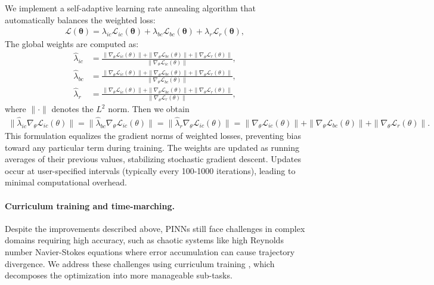 We implement a self-adaptive learning rate annealing algorithm \cite{wang2021understanding} that automatically balances the weighted loss:
\begin{align}
    \mathcal{L}(\mathbf{\theta}) =  \lambda_{ic} \mathcal{L}_{ic}(\mathbf{\theta}) + \lambda_{bc} \mathcal{L}_{bc}(\mathbf{\theta}) +  \lambda_r \mathcal{L}_r(\mathbf{\theta}), 
\end{align}
The global weights are computed as:
  \begin{align}
  \label{eq: lambda_ic_update}
     \hat{\lambda}_{ic} &=  \frac{  \|\nabla_{\theta}  \mathcal{L}_{ic}(\theta)\| +  \|\nabla_{\theta}  \mathcal{L}_{bc}(\theta)\| +  \|\nabla_{\theta}  \mathcal{L}_{r}(\theta)\|   } {\|\nabla_{\theta}  \mathcal{L}_{ic}(\theta)\|}, \\
     \label{eq: lambda_bc_update}
      \hat{\lambda}_{bc} &= \frac{  \|\nabla_{\theta}  \mathcal{L}_{ic}(\theta)\| +  \|\nabla_{\theta}  \mathcal{L}_{bc}(\theta)\| +  \|\nabla_{\theta}  \mathcal{L}_{r}(\theta)\|   } {\|\nabla_{\theta}  \mathcal{L}_{bc}(\theta)\|},  \\
      \label{eq: lambda_r_update}
       \hat{\lambda}_{r} &=  \frac{  \|\nabla_{\theta}  \mathcal{L}_{ic}(\theta)\| +  \|\nabla_{\theta}  \mathcal{L}_{bc}(\theta)\| +  \|\nabla_{\theta}  \mathcal{L}_{r}(\theta)\|   } {\|\nabla_{\theta}  \mathcal{L}_{r}(\theta)\|}, 
  \end{align}
where $\|\cdot\|$ denotes the $L^2$ norm.
Then we obtain
\begin{align}
  \| \hat{\lambda}_{ic} \nabla_\theta \mathcal{L}_{ic} (\theta) \| =   \| \hat{\lambda}_{bc} \nabla_\theta \mathcal{L}_{ic} (\theta) \| = \| \hat{\lambda}_{r} \nabla_\theta \mathcal{L}_{ic} (\theta) \| = \| \nabla_\theta \mathcal{L}_{ic} (\theta) \| +  \| \nabla_\theta \mathcal{L}_{bc} (\theta) \|  +  \| \nabla_\theta \mathcal{L}_{r} (\theta) \|. 
\end{align}
This formulation equalizes the gradient norms of weighted losses, preventing bias toward any particular term during training. The weights are updated as running averages of their previous values, stabilizing stochastic gradient descent. Updates occur at user-specified intervals (typically every 100-1000 iterations), leading to minimal computational overhead.


\paragraph{Curriculum training and time-marching.} Despite the improvements described above, PINNs still face challenges in complex domains requiring high accuracy, such as chaotic systems like high Reynolds number Navier-Stokes equations where error accumulation can cause trajectory divergence. We address these challenges using curriculum training \cite{krishnapriyan2021characterizing}, which decomposes the optimization into more manageable sub-tasks.

